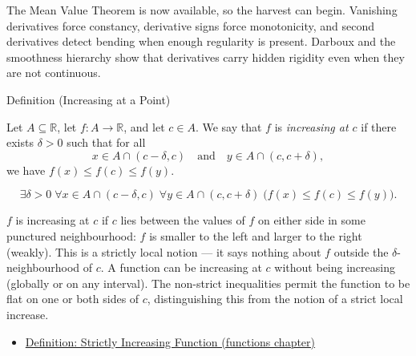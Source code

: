 
\begin{remark*}
The Mean Value Theorem is now available, so the harvest can begin. Vanishing
derivatives force constancy, derivative signs force monotonicity, and second
derivatives detect bending when enough regularity is present. Darboux and the
smoothness hierarchy show that derivatives carry hidden rigidity even when
they are not continuous.
\end{remark*}

\begin{definitionbox}{Definition (Increasing at a Point)}
\begin{definition}
\label{def:increasing-at-a-point}
Let $A \subseteq \mathbb{R}$, let $f : A \to \mathbb{R}$, and let $c \in A$. We say that $f$ is \emph{increasing at $c$} if there exists $\delta > 0$ such that for all
\[
x \in A \cap (c-\delta,c)
\quad \text{and} \quad
y \in A \cap (c,c+\delta),
\]
we have $f(x) \leq f(c) \leq f(y)$.
\end{definition}
\end{definitionbox}

\begin{remark*}
\[
\exists \delta > 0\;\forall x \in A \cap (c-\delta,c)\;\forall y \in A \cap (c,c+\delta)
\;\bigl(f(x) \leq f(c) \leq f(y)\bigr).
\]
\end{remark*}

\begin{remark*}[Interpretation]
$f$ is increasing at $c$ if $c$ lies between the values of $f$ on either side in some punctured neighbourhood: $f$ is smaller to the left and larger to the right (weakly). This is a strictly local notion --- it says nothing about $f$ outside the $\delta$-neighbourhood of $c$. A function can be increasing at $c$ without being increasing (globally or on any interval). The non-strict inequalities permit the function to be flat on one or both sides of $c$, distinguishing this from the notion of a strict local increase.
\end{remark*}

\begin{dependencies}
\begin{itemize}
  \item \hyperref[def:function-strictly-increasing]{Definition: Strictly Increasing Function (functions chapter)}
\end{itemize}
\end{dependencies}

